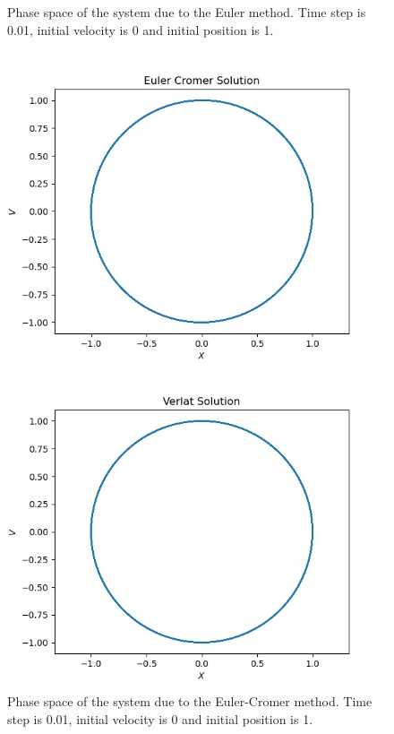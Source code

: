 \documentclass[12pt, a4paper]{article}
\begin{document}
\begin{figure}[h]
\begin{minipage}[b]{0.4\textwidth}
				\caption{Phase space of the system due to the Euler method. Time step
				is 0.01, initial velocity is 0 and initial position is 1.}
				\label{fig:q2_phase_space_Euler}
			\end{minipage}
			\begin{minipage}[b]{0.4\textwidth}
				\includegraphics[width=\textwidth]{../q2/q2_v_x_Euler Cromer Solution_0_62.83185307179586_0.01_x0=1_v0=0.jpg}
				\caption{Phase space of the system due to the Euler-Cromer method. Time step
				is 0.01, initial velocity is 0 and initial position is 1.}
				\label{fig:q2_phase_space_Euler_Cromer}
			\end{minipage}
			\hfill
			\begin{minipage}[b]{0.4\textwidth}
			\includegraphics[width=\textwidth]{../q2/q2_v_x_Verlat Solution_0_62.83185307179586_0.01_x0=1_v0=0.jpg}

\end{minipage}
\end{figure}
\end{document}

